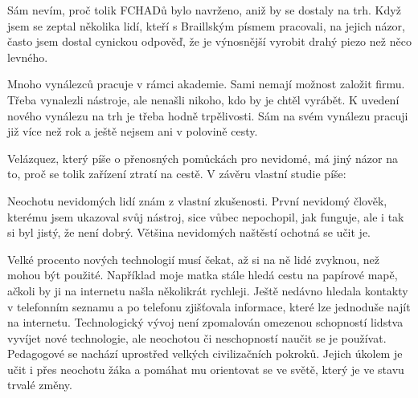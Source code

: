 Sám nevím, proč tolik FCHADů bylo navrženo, aniž by se dostaly na trh.  Když jsem se zeptal několika lidí, kteří s Braillským písmem pracovali, na jejich názor, často jsem dostal cynickou odpověď, že je výnosnější vyrobit drahý piezo než něco levného.

Mnoho vynálezců pracuje v rámci akademie. Sami nemají možnost založit firmu. Třeba vynalezli nástroje, ale nenašli nikoho, kdo by je chtěl vyrábět. K uvedení nového vynálezu na trh je třeba hodně trpělivosti. Sám na svém vynálezu pracuji již více než rok a ještě nejsem ani v polovině cesty.

Velázquez, který píše o přenosných pomůckách pro nevidomé, má jiný názor na to, proč se tolik zařízení ztratí na cestě.  V závěru vlastní studie píše:
\em
{}\em  \citep[str. 15, přeložený z angičtiny]{velazquez2010wearable}%

Neochotu nevidomých lidí znám z vlastní zkušenosti. První nevidomý člověk, kterému jsem ukazoval svůj nástroj, sice vůbec nepochopil, jak funguje, ale i tak si byl jistý, že není dobrý. Většina nevidomých naštěstí ochotná se učit je.

Velké procento nových technologií musí čekat, až si na ně lidé zvyknou, než mohou být použité.  Například moje matka stále hledá cestu na papírové mapě, ačkoli by ji na internetu našla několikrát rychleji.  Ještě nedávno hledala kontakty v telefonním seznamu a po telefonu zjišťovala informace, které lze jednoduše najít na internetu.  Technologický vývoj není zpomalován omezenou schopností lidstva vyvíjet nové technologie, ale neochotou či neschopností naučit se je používat.  Pedagogové se nachází uprostřed velkých civilizačních pokroků.  Jejich úkolem je učit i přes neochotu žáka a pomáhat mu orientovat se ve světě, který je ve stavu trvalé změny.

